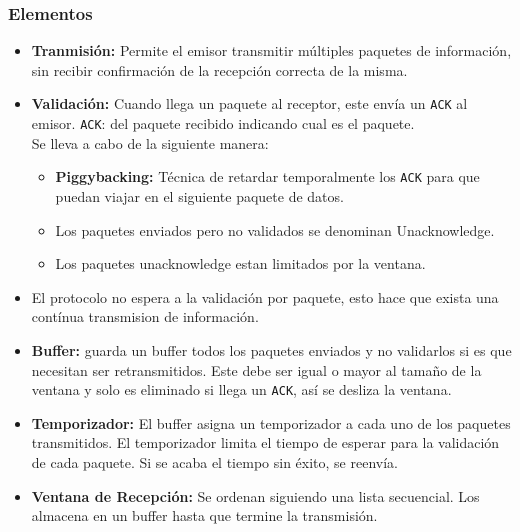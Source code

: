 \subsubsection*{Elementos}
\begin{itemize}
\item \textbf{Tranmisión:} Permite el emisor transmitir múltiples paquetes de información, sin recibir confirmación de la recepción correcta de la misma.
\item \textbf{Validación:} Cuando llega un paquete al receptor, este envía un \texttt{ACK} al emisor. \texttt{ACK}: del paquete recibido indicando cual es el paquete. \\${ }$\\
Se lleva a cabo de la siguiente manera:
\begin{itemize}
\item \textbf{Piggybacking:} Técnica de retardar temporalmente los \texttt{ACK} para que puedan viajar en el siguiente paquete de datos.
\item Los paquetes enviados pero no validados se denominan Unacknowledge.
\item Los paquetes unacknowledge estan limitados por la ventana.
\end{itemize}
\item El protocolo no espera a la validación por paquete, esto hace que exista una contínua transmision de información.
\item \textbf{Buffer:} guarda un buffer todos los paquetes enviados y no validarlos si es que necesitan ser retransmitidos. Este debe ser igual o mayor al tamaño de la ventana y solo es eliminado si llega un \texttt{ACK}, así se desliza la ventana.
\item \textbf{Temporizador:} El buffer asigna un temporizador a cada uno de los paquetes transmitidos. El temporizador limita el tiempo de esperar para la validación de cada paquete. Si se acaba el tiempo sin éxito, se reenvía.
\item \textbf{Ventana de Recepción:} Se ordenan siguiendo una lista secuencial. Los almacena en un buffer hasta que termine la transmisión.
\end{itemize}


